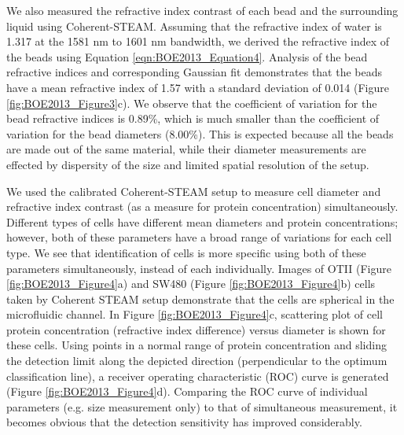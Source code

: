 We also measured the refractive index contrast of each bead and the surrounding liquid using Coherent-STEAM. Assuming that the refractive index of water is 1.317 at the 1581 nm to 1601 nm bandwidth, we derived the refractive index of the beads using Equation \eqref{eqn:BOE2013_Equation4}. Analysis of the bead refractive indices and corresponding Gaussian fit demonstrates that the beads have a mean refractive index of 1.57 with a standard deviation of 0.014 (Figure \ref{fig:BOE2013_Figure3}c). We observe that the coefficient of variation for the bead refractive indices is 0.89\%, which is much smaller than the coefficient of variation for the bead diameters (8.00\%). This is expected because all the beads are made out of the same material, while their diameter measurements are effected by dispersity of the size and limited spatial resolution of the setup.

We used the calibrated Coherent-STEAM setup to measure cell diameter and refractive index contrast (as a measure for protein concentration) simultaneously. Different types of cells have different mean diameters and protein concentrations; however, both of these parameters have a broad range of variations for each cell type. We see that identification of cells is more specific using both of these parameters simultaneously, instead of each individually. Images of OTII (Figure \ref{fig:BOE2013_Figure4}a) and SW480 (Figure \ref{fig:BOE2013_Figure4}b) cells taken by Coherent STEAM setup demonstrate that the cells are spherical in the microfluidic channel. In Figure \ref{fig:BOE2013_Figure4}c, scattering plot of cell protein concentration (refractive index difference) versus diameter is shown for these cells. Using points in a normal range of protein concentration and sliding the detection limit along the depicted direction (perpendicular to the optimum classification line), a receiver operating characteristic (ROC) curve is generated (Figure \ref{fig:BOE2013_Figure4}d). Comparing the ROC curve of individual parameters (e.g. size measurement only) to that of simultaneous measurement, it becomes obvious that the detection sensitivity has improved considerably. 

